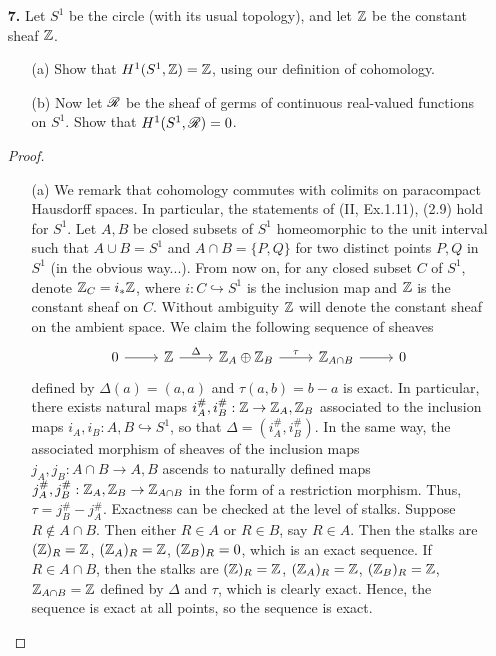 \documentclass{article}
\begin{document}
\begin{enumerate} [label=\textbf{\arabic*.}, leftmargin=0em]
\item[\textbf{7.}] Let $S^1$ be the circle (with its usual topology), and let $\mathbb{Z}$ be the constant sheaf $\mathbb{Z}$.
\begin{itemize}
    \item[(a)] Show that $H^1(S^1, \mathbb{Z}) = \mathbb{Z}$, using our definition of cohomology.
    \item[(b)] Now let $\mathscr{R}$ be the sheaf of germs of continuous real-valued functions on $S^1$. Show that $H^1(S^1, \mathscr{R}) = 0$.
\end{itemize}

\begin{proof} $ $ \vspace{0pt}
\begin{itemize} [leftmargin=0cm]
\item[(a)] We remark that cohomology commutes with colimits on paracompact Hausdorff spaces. In particular, the statements of (II, Ex.1.11), (2.9) hold for $S^1$. Let $A, B$ be closed subsets of $S^1$ homeomorphic to the unit interval such that $A \cup B = S^1$ and $A \cap B = \{ P, Q \}$ for two distinct points $P, Q$ in $S^1$ (in the obvious way...). From now on, for any closed subset $C$ of $S^1$, denote $\mathbb{Z}_C = i_* \mathbb{Z}$, where $i : C \hookrightarrow S^1$ is the inclusion map and $\mathbb{Z}$ is the constant sheaf on $C$. Without ambiguity $\mathbb{Z}$ will denote the constant sheaf on the ambient space. We claim the following sequence of sheaves
\[\begin{tikzcd}
    0 \arrow[r] & \Z \arrow[r, "\Delta"] & \Z_A \oplus \Z_B \arrow[r, "\tau"] & \Z_{A \cap B} \arrow[r] & 0
    \end{tikzcd}\]
defined by $\Delta(a) = (a, a)$ and $\tau(a, b) = b - a$ is exact. In particular, there exists natural maps $i^\#_A, i^\#_B : \mathbb{Z} \to \mathbb{Z}_A, \mathbb{Z}_B$ associated to the inclusion maps $i_A, i_B : A, B \hookrightarrow S^1$, so that $\Delta = (i_A^\#, i_B^\#)$. In the same way, the associated morphism of sheaves of the inclusion maps $j_A, j_B : A \cap B \to A, B$ ascends to naturally defined maps $j_A^\#, j_B^\# : \mathbb{Z}_A, \mathbb{Z}_B \to \mathbb{Z}_{A \cap B}$ in the form of a restriction morphism. Thus, $\tau = j_B^\# - j_A^\#$. Exactness can be checked at the level of stalks. Suppose $R \notin A \cap B$. Then either $R \in A$ or $R \in B$, say $R \in A$. Then the stalks are $(\mathbb{Z})_R = \mathbb{Z}$, $(\mathbb{Z}_A)_R = \mathbb{Z}$, $(\mathbb{Z}_B)_R = 0$, which is an exact sequence. If $R \in A \cap B$, then the stalks are $(\mathbb{Z})_R = \mathbb{Z}$, $(\mathbb{Z}_A)_R = \mathbb{Z}$, $(\mathbb{Z}_B)_R = \mathbb{Z}$, $\mathbb{Z}_{A \cap B} = \mathbb{Z}$ defined by $\Delta$ and $\tau$, which is clearly exact. Hence, the sequence is exact at all points, so the sequence is exact.


\end{itemize}
\end{proof}
\end{enumerate}
\end{document}
